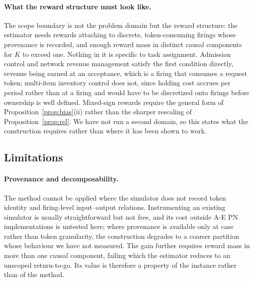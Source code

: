 \documentclass[review,authoryear,3p,times]{elsarticle}
\begin{document}
\paragraph{What the reward structure must look like.} The scope boundary is not
the problem domain but the reward structure: the estimator needs rewards
attaching to discrete, token-consuming firings whose provenance is recorded, and
enough reward mass in distinct causal components for $K$ to exceed one. Nothing
in it is specific to task assignment. Admission control and network revenue
management satisfy the first condition directly, revenue being earned at an
acceptance, which is a firing that consumes a request token; multi-item
inventory control does not, since holding cost accrues per period rather than at
a firing and would have to be discretized onto firings before ownership is well
defined. Mixed-sign rewards require the general form of
Proposition~\ref{prop:bias}(ii) rather than the sharper rescaling of
Proposition~\ref{prop:rel}. We have not run a second domain, so this states what
the construction requires rather than where it has been shown to work.

\subsection{Limitations}
\label{sec:limitations}

\paragraph{Provenance and decomposability.} The method cannot be applied where
the simulator does not record token identity and firing-level input--output
relations. Instrumenting an existing simulator is usually straightforward but
not free, and its cost outside A-E PN implementations is untested here; where
provenance is available only at case rather than token granularity, the
construction degrades to a coarser partition whose behaviour we have not
measured. The gain further requires reward mass in more than one causal
component, failing which the estimator reduces to an unscoped return-to-go. Its
value is therefore a property of the instance rather than of the method.
\end{document}

